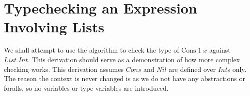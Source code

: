






\section{Typechecking an Expression Involving Lists}
We shall attempt to use the algorithm to check the type of $\text{Cons}\;1\;x$ against $List\;Int$. This derivation should serve as a demonstration of how more complex checking works. This derivation assumes $Cons$ and $Nil$ are defined over $Int$s only. The reason the context is never changed is as we do not have any abstractions or foralls, so no variables or type variables are introduced.

